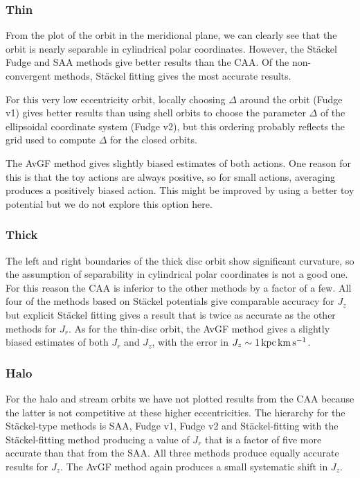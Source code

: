 \documentclass[useAMS,usenatbib,fleqn,a4paper]{mn2e}
\def\kpc{\,{\rm kpc}}
\def\kms{\,{\rm km\,s^{-1}}}
\begin{document}
\subsubsection{Thin}

From the plot of the orbit in the meridional plane, we can clearly see that
the orbit is nearly separable in cylindrical polar coordinates. However, the
St\"ackel Fudge and SAA  methods give better results than the CAA. Of the
non-convergent methods, St\"ackel fitting gives the most accurate results.

For this very low eccentricity orbit, locally choosing $\Delta$ around the
orbit (Fudge v1) gives better results than using shell orbits to choose the
parameter $\Delta$ of the ellipsoidal coordinate system (Fudge v2), but this
ordering probably reflects the grid used to compute $\Delta$ for the closed
orbits.

The AvGF method gives slightly biased estimates of both actions. One
reason for this is that the toy actions are always positive, so for small
actions, averaging produces a positively biased action.  This might be improved
by using a better toy potential but we do not explore this option here.

\subsubsection{Thick}

The left and right boundaries of the thick disc orbit show significant
curvature, so the assumption of separability in cylindrical polar coordinates
is not a good one. For this reason the CAA is inferior to
the other methods by a factor of a few. All four of the methods based on
St\"ackel potentials give comparable accuracy for $J_z$ but explicit St\"ackel
fitting gives a result that is twice as  accurate as the other methods for
$J_r$. As for the thin-disc orbit, the AvGF method gives a slightly
biased estimates of both $J_r$ and $J_z$, with the error in $J_z\sim
1\kpc\kms$.

\subsubsection{Halo}

For the halo and stream orbits we have not plotted results from the CAA
because the latter is not competitive at these higher eccentricities.  The
hierarchy for the St\"ackel-type methods is SAA, Fudge v1, Fudge v2 and
St\"ackel-fitting with the St\"ackel-fitting method producing a value of
$J_r$ that is a factor of five more accurate than that from the SAA.  All
three methods produce equally accurate results for $J_z$. The AvGF
method again produces a small systematic shift in $J_z$.
\end{document}
